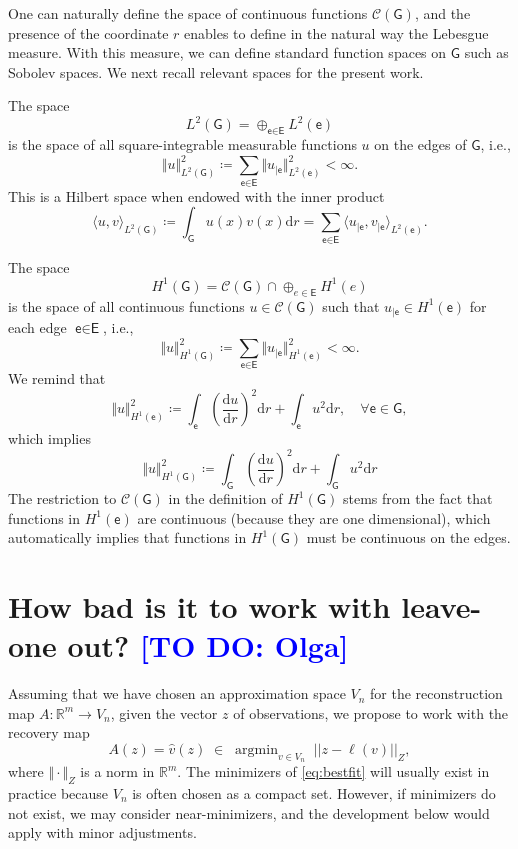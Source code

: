 \documentclass[11pt,a4paper,twoside]{article}
\theoremstyle{definition}
\numberwithin{equation}{section}
\newcommand{\cC}{\ensuremath{\mathcal{C}}}
\newcommand{\bR}{\ensuremath{\mathbb{R}}}
\newcommand{\G}{\ensuremath{\textsf{G}}} %
\newcommand{\E}{\ensuremath{\textsf{E}}} %
\newcommand{\V}{\ensuremath{\textsf{V}}} %
\newcommand{\vv}{\ensuremath{\textsf{v}}}
\newcommand{\ee}{\ensuremath{\textsf{e}}}
\newcommand{\<}{\langle}
\renewcommand{\>}{\rangle}
\newcommand{\argmin}{\operatorname{argmin}}
\newcommand{\dd}{\ensuremath{\mathrm d}}
\newcommand{\dr}{\ensuremath{\mathrm dr}}
\newcommand{\om}[1]{\textcolor{blue}{#1}}
\begin{document}
One can naturally define the space of continuous functions $\cC(\G)$, and the presence of the coordinate $r$ enables to define in the natural way the Lebesgue measure. With this measure, we can define standard function spaces on $\G$ such as Sobolev spaces. We next recall relevant spaces for the present work.


The space
$$
L^2(\G) = \oplus_{\ee\in \E} L^2(\ee)
$$
is the space of all square-integrable measurable functions $u$ on the edges of $\G$, i.e.,
\begin{equation}
      \Vert u \Vert^2_{L^2(\G)} \coloneqq \sum_{\ee\in \E} \Vert u_{|\ee} \Vert^2_{L^2(\ee)} <\infty.
\end{equation}
This is a Hilbert space when endowed with the inner product
$$
\<u, v \>_{L^2(\G)}
\coloneqq \int_\G u(x)v(x)\dr
=\sum_{\ee\in \E} \< u_{|\ee} , v_{|\ee}\>_{L^2(\ee)}.
$$

The space 
$$
H^1(\G) =  \cC(\G)\cap\oplus_{e\in \E} H^1(e)
$$
is the space of all continuous functions $u\in \cC(\G)$ such that $u_{|\ee} \in H^1(\ee)$ for each edge $\ee\in \E$, i.e.,
\begin{equation}
      \Vert u \Vert^2_{H^1(\G)} \coloneqq \sum_{\ee\in \E} \Vert u_{|\ee} \Vert^2_{H^1(\ee)} <\infty.
\end{equation}
We remind that
$$
\Vert u \Vert^2_{H^1(\ee)} \coloneqq \int_\ee \left( \frac{\dd u}{\dr} \right)^2 \dr + \int_\ee u^2\dr,\quad \forall \ee \in \G,
$$
which implies
$$
\Vert u \Vert^2_{H^1(\G)} \coloneqq \int_\G \left( \frac{\dd u}{\dr} \right)^2 \dr + \int_\G u^2\dr
$$
The restriction to $\cC(\G)$ in the definition of $H^1(\G)$ stems from the fact that functions in $H^1(\ee)$ are continuous (because they are one dimensional), which automatically implies that functions in $H^1(\G)$ must be continuous on the edges.


\appendix
\section{How bad is it to work with leave-one out? \om{[TO DO: Olga]}}
Assuming that we have chosen an approximation space $V_n$ for the reconstruction map $A:\bR^m \to V_n$, given the vector $z$ of observations, we propose to work with the recovery map
\begin{equation}
\label{eq:bestfit}
A(z) = \hat v(z) \;\in\; \argmin_{v \in V_n} \; || z - \ell(v) ||_Z ,
\end{equation}
where $\Vert \cdot \Vert_Z$ is a norm in $\bR^m$. The minimizers of \eqref{eq:bestfit} will usually exist in practice because $V_n$ is often chosen as a compact set. However, if minimizers do not exist, we may consider near-minimizers, and the development below would apply with minor adjustments.
\end{document}
